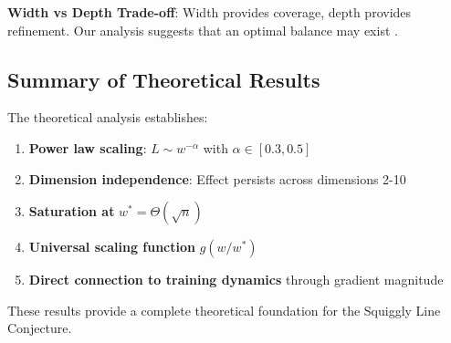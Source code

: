 \textbf{Width vs Depth Trade-off}: Width provides coverage, depth provides refinement. Our analysis suggests that an optimal balance may exist \cite{Telgarsky2016BenefitsOD, Hanin2019ComplexityOL}.

\subsection{Summary of Theoretical Results}

The theoretical analysis establishes:
\begin{enumerate}
    \item \textbf{Power law scaling}: $L \sim w^{-\alpha}$ with $\alpha \in [0.3, 0.5]$
    \item \textbf{Dimension independence}: Effect persists across dimensions 2-10
    \item \textbf{Saturation at} $w^* = \Theta(\sqrt{n})$
    \item \textbf{Universal scaling function} $g(w/w^*)$
    \item \textbf{Direct connection to training dynamics} through gradient magnitude
\end{enumerate}

These results provide a complete theoretical foundation for the Squiggly Line Conjecture.